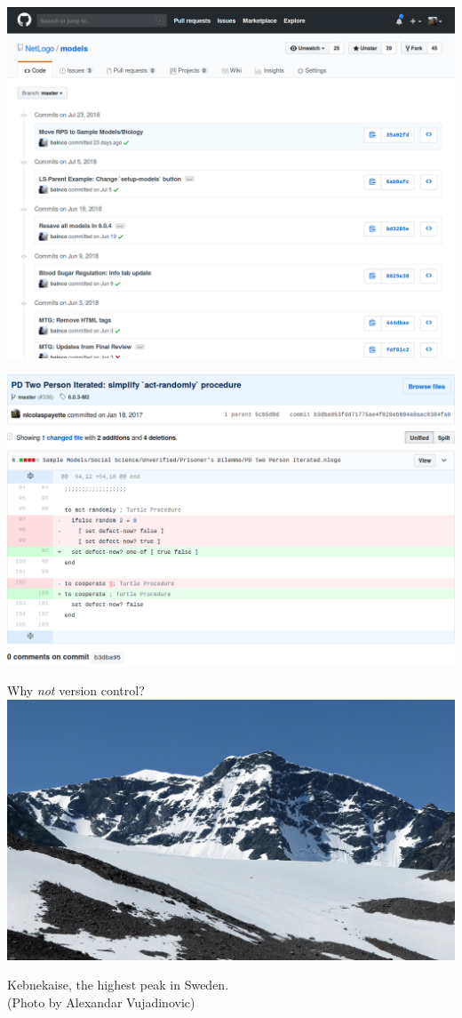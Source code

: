 \documentclass{beamer}
\newcommand\nt[1]{\textcolor{black!40}{#1}}
\begin{document}
\begin{frame}[plain]
  \includegraphics[width=\textwidth]{commits}
\end{frame}

\begin{frame}[plain]
  \includegraphics[width=\textwidth]{diffs}
\end{frame}

\begin{frame}{Why \emph{not} version control?}
  \centering
  \includegraphics[width=\textwidth]{Kebnekaise.jpg}

  Kebnekaise, the highest peak in Sweden.\\
  \nt{\footnotesize (Photo by Alexandar Vujadinovic)}
\end{frame}
\end{document}
